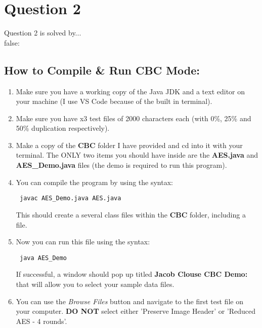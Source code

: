 \documentclass[10pt]{article}
\begin{document}
\vspace{0.2in}
\section{Question 2}
\noindent Question 2 is solved by...
\vspace{0.2in}
\\








\if false:
\subsection{How to Compile \& Run CBC Mode: } 
\begin{enumerate}
	\item Make sure you have a working copy of the Java JDK and a text editor on your machine (I use VS Code because of the built in terminal).
	
	\item Make sure you have x3 test files of 2000 characters each (with 0\%, 25\% and 50\% duplication respectively).
	
	\item Make a copy of the \textbf{CBC} folder I have provided and cd into it with your terminal. The ONLY two items you should have inside are the \textbf{AES.java} and \textbf{AES\_Demo.java} files (the demo is required to run this program).
	
	\item You can compile the program by using the syntax: \begin{verbatim} javac AES_Demo.java AES.java \end{verbatim}
	This should create a several class files within the \textbf{CBC} folder, including a  file.
	
	\item Now you can run this file using the syntax: 
	\begin{verbatim} java AES_Demo \end{verbatim} 
	If successful, a window should pop up titled \textbf{Jacob Clouse CBC Demo:} that will allow you to select your sample data files. 
	
	\item You can use the \textit{Browse Files} button and navigate to the first test file on your computer. \textbf{DO NOT} select either 'Preserve Image Header' or 'Reduced AES - 4 rounds'. 
	

\end{enumerate}
\end{document}

